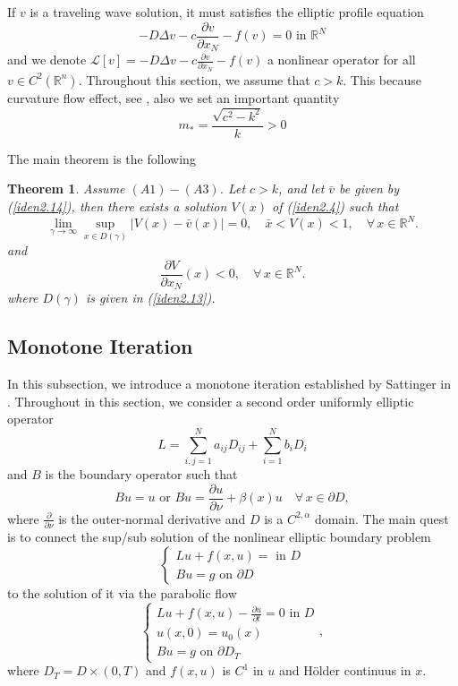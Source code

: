 \documentclass[12pt, a4paper]{article}
\newtheorem{thm}{Theorem}[section]
\numberwithin{equation}{section}
\renewcommand{\L}{\mathcal{L}}
\newcommand{\R}{\mathbb{R}}
\newcommand{\pd}[2]{\frac{\partial #1}{\partial #2}}
\begin{document}
\begin{CJK}{UTF8}{bkai}
If $v$ is a traveling wave solution, it must satisfies the elliptic profile equation
\begin{equation}\label{iden2.4}
	-D\Delta v-c\pd{v}{x_N}-f(v)=0\mbox{ in }\R^N
\end{equation}
and we denote $\L[v]=-D\Delta v-c\pd{v}{x_N}-f(v)$ a nonlinear operator for all $v\in C^2(\R^n)$. Throughout this section, we assume that $c>k$. This because curvature flow effect, see \cite{NT2006}, also we set an important quantity
\begin{equation}
	m_*=\frac{\sqrt{c^2-k^2}}{k}>0
\end{equation}

The main theorem is the following

\begin{thm}\cite[Theorem~1.1]{KT2011}\label{thm2.1}
	Assume $(A1)-(A3)$. Let $c>k$, and let $\bar{v}$ be given by (\ref{iden2.14}), then there exists a solution $V(x)$ of (\ref{iden2.4}) such that 
\begin{equation}
	\lim_{\gamma\to\infty}\sup_{x\in D(\gamma)}|V(x)-\bar{v}(x)|=0,\quad \bar{x}<V(x)<1,\quad\forall\,x\in\R^N.
\end{equation}
and 
\begin{equation}
	\pd{V}{x_N}(x)<0,\quad\forall\,x\in\R^N.
\end{equation}
where $D(\gamma)$ is given in (\ref{iden2.13}).
\end{thm}



\subsection{Monotone Iteration}

	In this subsection, we introduce a monotone iteration established by Sattinger in \cite{Sa1972}. Throughout in this section, we consider a second order uniformly elliptic operator
\[
	L=\sum_{i,j=1}^Na_{ij}D_{ij}+\sum_{i=1}^N b_iD_{i}
\]
and $B$ is the boundary operator such that
\[
	Bu=u\mbox{ or }Bu=\pd{u}{\nu}+\beta(x)u\quad\forall\,x\in\partial D,
\]
where $\pd{}{\nu}$ is the outer-normal derivative and $D$ is a $C^{2,\alpha}$ domain. The main quest is to connect the sup/sub solution of the nonlinear elliptic boundary problem
\begin{equation}\label{iden2.8}
\begin{cases}
	Lu+f(x,u)=\mbox{ in }D\\
	Bu=g\mbox{ on }\partial D
\end{cases}
\end{equation} 
to the solution of it via the parabolic flow
\begin{equation}\label{iden2.9}
\begin{cases}
	Lu+f(x,u)-\pd{u}{t}=0\mbox{ in }D\\
	u(x,0)=u_0(x)\\
	Bu=g\mbox{ on }\partial D_T
\end{cases},
\end{equation}
where $D_T=D\times(0,T)$ and $f(x,u)$ is $C^1$ in $u$ and H\"older continuus in $x$.


\end{CJK}
\end{document}

